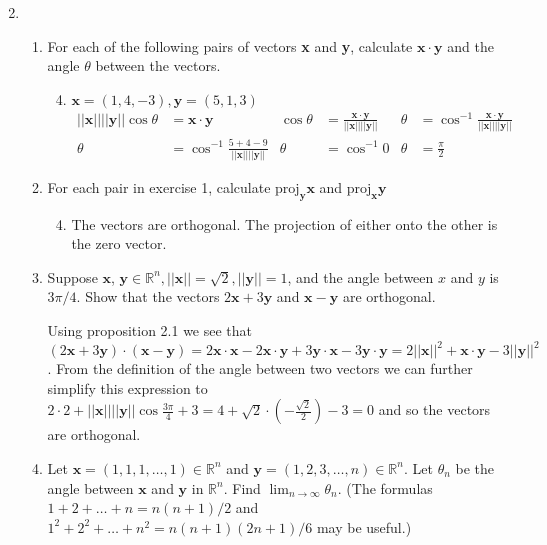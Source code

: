 \documentclass[letterpaper]{article}
\begin{document}
\renewcommand{\labelenumi}{1.\arabic{enumi}}
\renewcommand{\labelenumii}{\arabic{enumii}.}
\renewcommand{\labelenumiii}{\alph{enumiii}.}
\begin{enumerate}
\setcounter{enumi}{1}
\item
  \begin{enumerate}
  \item
    For each of the following pairs of vectors {\bfseries x} and {\bfseries y}, calculate $\mathbf{x}\cdot\mathbf{y}$ and the  angle $\theta$ between the vectors.
    \begin{enumerate}
    \setcounter{enumiii}{3}
    \item
      $\mathbf{x}=(1,4,-3),\mathbf{y}=(5,1,3)$
      \begin{align*}
        ||\mathbf{x}||||\mathbf{y}||\cos \theta&=\mathbf{x\cdot y}&
        \cos \theta&=\frac{\mathbf{x\cdot y}}{||\mathbf{x}||||\mathbf{y}||}&
        \theta&=\cos^{-1}\frac{\mathbf{x\cdot y}}{||\mathbf{x}||||\mathbf{y}||}\\
        \theta&=\cos^{-1}\frac{5+4-9}{||\mathbf{x}||||\mathbf{y}||}&
        \theta&=\cos^{-1}0&
        \theta&=\frac{\pi}{2}
      \end{align*}
    \end{enumerate}
  \item
    For each pair in exercise 1, calculate $\text{proj}_{\mathbf{y}}\mathbf{x}$ and $\text{proj}_{\mathbf{x}}\mathbf{y}$
    \begin{enumerate}
    \setcounter{enumiii}{3}
    \item
      The vectors are orthogonal. The projection of either onto the other is the zero vector.
    \end{enumerate}
  \setcounter{enumii}{6}
  \item
    Suppose $\mathbf{x}$, $\mathbf{y}\in \mathbb{R}^n, ||\mathbf{x}||=\sqrt{2}, ||\mathbf{y}||=1$, and the angle between $x$ and $y$ is $3\pi/4$. Show that the vectors $2\mathbf{x}+3\mathbf{y}$ and $\mathbf{x}-\mathbf{y}$ are orthogonal.

    Using proposition 2.1 we see that $(2\mathbf{x}+3\mathbf{y})\cdot(\mathbf{x}-\mathbf{y})=2\mathbf{x}\cdot\mathbf{x}-2\mathbf{x}\cdot\mathbf{y}+3\mathbf{y}\cdot\mathbf{x}-3\mathbf{y}\cdot\mathbf{y}=2||\mathbf{x}||^2+\mathbf{x}\cdot\mathbf{y}-3||\mathbf{y}||^2$. From the definition of the angle between two vectors we can further simplify this expression to $2\cdot 2+||\mathbf{x}||||\mathbf{y}||\cos \frac{3\pi}{4}+3=4+\sqrt{2}\cdot(-\frac{\sqrt{2}}{2})-3=0$ and so the vectors are orthogonal.
  \setcounter{enumii}{9}
  \item
    Let $\mathbf{x}=(1,1,1,\dots,1)\in \mathbb{R}^n$ and $\mathbf{y}=(1,2,3,\dots,n)\in \mathbb{R}^n$. Let $\theta_n$ be the angle between $\mathbf{x}$ and $\mathbf{y}$ in $\mathbb{R}^n$. Find $\displaystyle \lim_{n\to \infty}\theta_n$. (The formulas $1+2+\dots+n=n(n+1)/2$ and $1^2+2^2+\dots+n^2=n(n+1)(2n+1)/6$ may be useful.)


\end{enumerate}
\end{enumerate}
\end{document}
